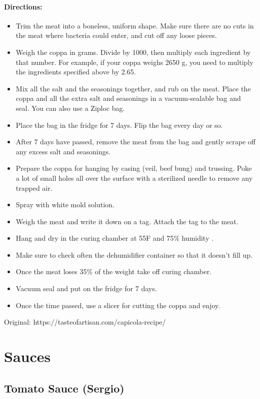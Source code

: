 \documentclass{article}
\begin{document}
\paragraph{Directions:}
\begin{itemize}
	\item Trim the meat into a boneless, uniform shape. Make sure there are no cuts in the meat where bacteria could enter, and cut off any loose pieces.
	\item Weigh the coppa in grams. Divide by 1000, then multiply each ingredient by that number. For example, if your coppa weighs 2650 g, you need to multiply the ingredients specified above by 2.65.
	\item Mix all the salt and the seasonings together, and rub on the meat. Place the coppa and all the extra salt and seasonings in a vacuum-sealable bag and seal. You can also use a Ziploc bag.
	\item Place the bag in the fridge for 7 days. Flip the bag every day or so.
	
	\item After 7 days have passed, remove the meat from the bag and gently scrape off any excess salt and seasonings.
	\item Prepare the coppa for hanging by casing (veil, beef bung) and trussing. Poke a lot of small holes all over the surface with a sterilized needle to remove any trapped air.
	\item Spray with white mold solution.
	\item Weigh the meat and write it down on a tag. Attach the tag to the meat.
	\item Hang and dry in the curing chamber at 55F and 75\% humidity .
	\item Make sure to check often the dehumidifier container so that it doesn't fill up.
	\item Once the meat loses 35\% of the weight take off curing chamber.
	\item Vacuum seal and put on the fridge for 7 days.
	\item Once the time passed, use a slicer for cutting the coppa and enjoy.
\end{itemize}

Original: https://tasteofartisan.com/capicola-recipe/

\section{Sauces}

\subsection{Tomato Sauce (Sergio)}
\end{document}
